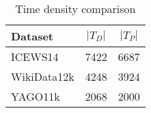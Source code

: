 \begin{table}[htb]
\centering
\begin{minipage}{0.95\columnwidth}
\centering
\caption{Time density comparison}
\vspace{-3mm}

\begin{tabular}{l|cc}\hline
Dataset  & $|T_D|$ & $|T_P|$ \\ \hline
ICEWS14  & 7422    & 6687    \\
WikiData12k & 4248    & 3924    \\
YAGO11k     & 2068    & 2000    \\\hline
\end{tabular}

\label{tab:time_density_testset_stats}
\end{minipage}
\end{table}

